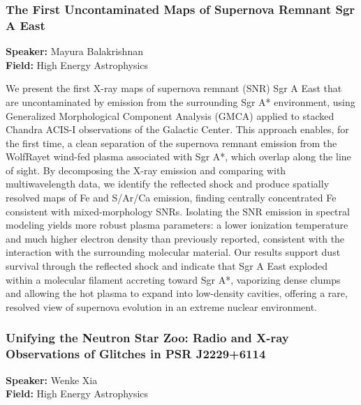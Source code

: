 \hypertarget{abstract-talk-13}{}\label{abstract-page-talk-13}
\subsubsection*{The First Uncontaminated Maps of Supernova Remnant Sgr A East}
\textbf{Speaker:} Mayura Balakrishnan\\
\textbf{Field:} High Energy Astrophysics

We present the first X-ray maps of supernova remnant (SNR) Sgr A East that are uncontaminated by emission from the surrounding Sgr A* environment, using Generalized Morphological Component Analysis (GMCA) applied to stacked Chandra ACIS-I observations of the Galactic Center. This approach enables, for the first time, a clean separation of the supernova remnant emission from the WolfRayet wind-fed plasma associated with Sgr A*, which overlap along the line of sight. By decomposing the X-ray emission and comparing with multiwavelength data, we identify the reflected shock and produce spatially resolved maps of Fe and S/Ar/Ca emission, finding centrally concentrated Fe consistent with mixed-morphology SNRs. Isolating the SNR emission in spectral modeling yields more robust plasma parameters: a lower ionization temperature and much higher electron density than previously reported, consistent with the interaction with the surrounding molecular material. Our results support dust survival through the reflected shock and indicate that Sgr A East exploded within a molecular filament accreting toward Sgr A*, vaporizing dense clumps and allowing the hot plasma to expand into low-density cavities, offering a rare, resolved view of supernova evolution in an extreme nuclear environment.

\hypertarget{abstract-talk-248}{}\label{abstract-page-talk-248}
\subsubsection*{Unifying the Neutron Star Zoo: Radio and X-ray Observations of Glitches in PSR J2229+6114}
\textbf{Speaker:} Wenke Xia\\
\textbf{Field:} High Energy Astrophysics

